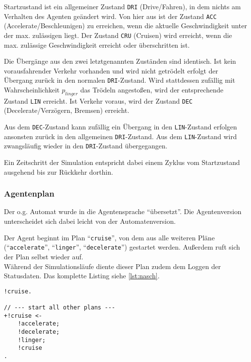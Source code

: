 Startzustand ist ein allgemeiner Zustand \texttt{DRI} (Drive/Fahren), in dem nichts am Verhalten des Agenten geändert wird.
Von hier aus ist der Zustand \texttt{ACC} (Accelerate/Beschleunigen) zu erreichen, wenn die aktuelle Geschwindigkeit unter der max. zulässigen liegt. 
Der Zustand \texttt{CRU} (Cruisen) wird erreicht, wenn die max. zulässige Geschwindigkeit erreicht oder überschritten ist.

Die Übergänge aus den zwei letztgenannten Zuständen sind identisch. 
Ist kein vorausfahrender Verkehr vorhanden und wird nicht getrödelt erfolgt der Übergang zurück in den normalen \texttt{DRI}-Zustand.
Wird stattdessen zufällig mit Wahrscheinlichkeit $ p_{linger} $ das Trödeln angestoßen, wird der entsprechende Zustand \texttt{LIN} erreicht.
Ist Verkehr voraus, wird der Zustand \texttt{DEC} (Decelerate/Verzögern, Bremsen) erreicht.

Aus dem \texttt{DEC}-Zustand kann zufällig ein Übergang in den \texttt{LIN}-Zustand erfolgen ansonsten zurück in den allgemeinen \texttt{DRI}-Zustand.
Aus dem \texttt{LIN}-Zustand wird zwangsläufig wieder in den \texttt{DRI}-Zustand übergegangen.

Ein Zeitschritt der Simulation entspricht dabei einem Zyklus vom Startzustand ausgehend bis zur Rückkehr dorthin.


\subsubsection{Agentenplan}

Der o.g. Automat wurde in die Agentensprache \enquote{übersetzt}. 
Die Agentenversion unterscheidet sich dabei leicht von der Automatenversion. 

Der Agent beginnt im Plan \enquote{\texttt{cruise}}, von dem aus alle weiteren Pläne (\enquote{\texttt{accelerate}}, \enquote{\texttt{linger}}, \enquote{\texttt{decelerate}}) gestartet werden.
Außerdem ruft sich der Plan selbst wieder auf.
\\
Während der Simulationsläufe diente dieser Plan zudem dem Loggen der Statusdaten.
Das komplette Listing siehe \cref{lst:nasch}.

\begin{minipage}[hptb]{0.95\textwidth}
\begin{lstlisting}[style=asl, 
                   keywords={!cruise}, 
                   keywords={[2]}, 
                   keywords={[3]}, 
                   caption={Auszug aus Agentenscript: single lane-Version},
                   label={lst:nasch-auszug}]      
!cruise.

// --- start all other plans ---
+!cruise <-
    !accelerate;
    !decelerate;
    !linger;
    !cruise
.\end{lstlisting}
\end{minipage}

